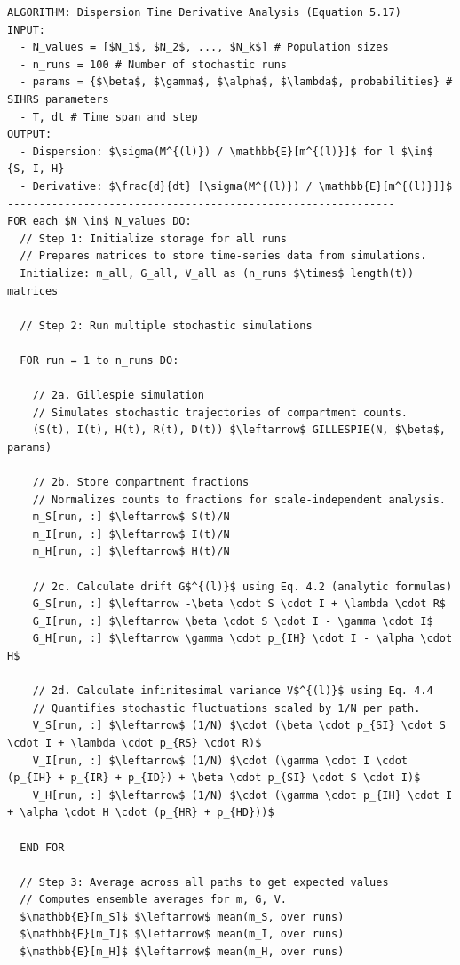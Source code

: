 \documentclass{article}
\begin{document}
\begin{lstlisting}
ALGORITHM: Dispersion Time Derivative Analysis (Equation 5.17)
INPUT:
  - N_values = [$N_1$, $N_2$, ..., $N_k$] # Population sizes
  - n_runs = 100 # Number of stochastic runs
  - params = {$\beta$, $\gamma$, $\alpha$, $\lambda$, probabilities} # SIHRS parameters
  - T, dt # Time span and step
OUTPUT:
  - Dispersion: $\sigma(M^{(l)}) / \mathbb{E}[m^{(l)}]$ for l $\in$ {S, I, H}
  - Derivative: $\frac{d}{dt} [\sigma(M^{(l)}) / \mathbb{E}[m^{(l)}]]$
-------------------------------------------------------------
FOR each $N \in$ N_values DO:
  // Step 1: Initialize storage for all runs
  // Prepares matrices to store time-series data from simulations.
  Initialize: m_all, G_all, V_all as (n_runs $\times$ length(t)) matrices
 
  // Step 2: Run multiple stochastic simulations

  FOR run = 1 to n_runs DO:
 
    // 2a. Gillespie simulation
    // Simulates stochastic trajectories of compartment counts.
    (S(t), I(t), H(t), R(t), D(t)) $\leftarrow$ GILLESPIE(N, $\beta$, params)
   
    // 2b. Store compartment fractions
    // Normalizes counts to fractions for scale-independent analysis.
    m_S[run, :] $\leftarrow$ S(t)/N
    m_I[run, :] $\leftarrow$ I(t)/N
    m_H[run, :] $\leftarrow$ H(t)/N
   
    // 2c. Calculate drift G$^{(l)}$ using Eq. 4.2 (analytic formulas)
    G_S[run, :] $\leftarrow -\beta \cdot S \cdot I + \lambda \cdot R$
    G_I[run, :] $\leftarrow \beta \cdot S \cdot I - \gamma \cdot I$
    G_H[run, :] $\leftarrow \gamma \cdot p_{IH} \cdot I - \alpha \cdot H$
   
    // 2d. Calculate infinitesimal variance V$^{(l)}$ using Eq. 4.4
    // Quantifies stochastic fluctuations scaled by 1/N per path.
    V_S[run, :] $\leftarrow$ (1/N) $\cdot (\beta \cdot p_{SI} \cdot S \cdot I + \lambda \cdot p_{RS} \cdot R)$
    V_I[run, :] $\leftarrow$ (1/N) $\cdot (\gamma \cdot I \cdot (p_{IH} + p_{IR} + p_{ID}) + \beta \cdot p_{SI} \cdot S \cdot I)$
    V_H[run, :] $\leftarrow$ (1/N) $\cdot (\gamma \cdot p_{IH} \cdot I + \alpha \cdot H \cdot (p_{HR} + p_{HD}))$
 
  END FOR
 
  // Step 3: Average across all paths to get expected values
  // Computes ensemble averages for m, G, V.
  $\mathbb{E}[m_S]$ $\leftarrow$ mean(m_S, over runs)
  $\mathbb{E}[m_I]$ $\leftarrow$ mean(m_I, over runs)
  $\mathbb{E}[m_H]$ $\leftarrow$ mean(m_H, over runs)
 

\end{lstlisting}
\end{document}
